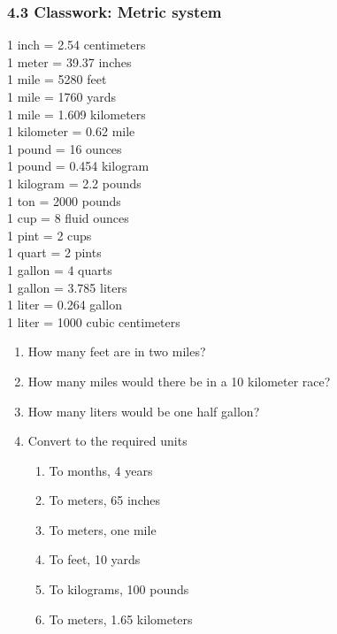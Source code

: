 

\fancyhead[LE]{\thepage}



\subsubsection*{4.3 Classwork: Metric system}
\begin{multicols}{3}
  1 inch = 2.54 centimeters\\
  1 meter = 39.37 inches\\
  1 mile = 5280 feet\\
  1 mile = 1760 yards\\
  1 mile = 1.609 kilometers\\
  1 kilometer = 0.62 mile\\
  1 pound = 16 ounces\\
  1 pound = 0.454 kilogram \\
  1 kilogram = 2.2 pounds \\
  1 ton = 2000 pounds\\
  1 cup = 8 fluid ounces \\
  1 pint = 2 cups\\
  1 quart = 2 pints\\
  1 gallon = 4 quarts\\
  1 gallon = 3.785 liters\\
  1 liter = 0.264 gallon\\
  1 liter = 1000 cubic centimeters
\end{multicols}

\begin{enumerate}[itemsep=1.75cm]
  \item How many feet are in two miles?
  \item How many miles would there be in a 10 kilometer race?
  \item How many liters would be one half gallon?
  
\item Convert to the required units
  \begin{multicols}{2}
    \begin{enumerate}[itemsep=3cm]
      \item To months, 4 years
      \item To meters, 65 inches
      \item To meters, one mile
      \item To feet, 10 yards
      \item To kilograms, 100 pounds
      \item To meters, 1.65 kilometers
    \end{enumerate}
  \end{multicols}
  

\end{enumerate}

